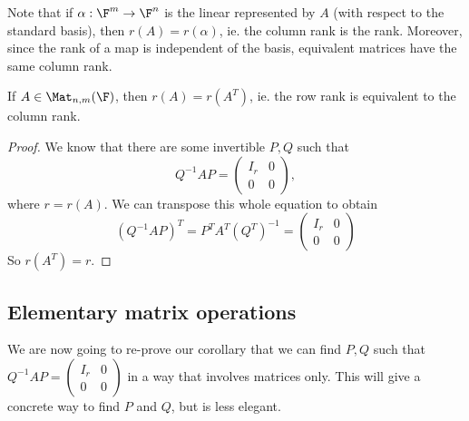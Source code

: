\documentclass[a4paper]{article}
\begin{document}
Note that if $\alpha: \F^m \to \F^n$ is the linear represented by $A$ (with respect to the standard basis), then $r(A) = r(\alpha)$, ie. the column rank is the rank. Moreover, since the rank of a map is independent of the basis, equivalent matrices have the same column rank.

\begin{thm}
  If $A \in \Mat_{n, m}(\F)$, then $r(A) = r(A^T)$, ie. the row rank is equivalent to the column rank.
\end{thm}

\begin{proof}
  We know that there are some invertible $P, Q$ such that
  \[
    Q^{-1}AP =
    \begin{pmatrix}
      I_r & 0\\
      0 & 0
    \end{pmatrix},
  \]
  where $r = r(A)$. We can transpose this whole equation to obtain
  \[
    (Q^{-1}AP)^T = P^T A^T (Q^T)^{-1} =
    \begin{pmatrix}
      I_r & 0\\
      0 & 0
    \end{pmatrix}
  \]
  So $r(A^T) = r$.
\end{proof}

\subsection{Elementary matrix operations}
We are now going to re-prove our corollary that we can find $P, Q$ such that $Q^{-1}AP = \begin{pmatrix} I_r & 0\\ 0 & 0 \end{pmatrix}$ in a way that involves matrices only. This will give a concrete way to find $P$ and $Q$, but is less elegant.
\end{document}

